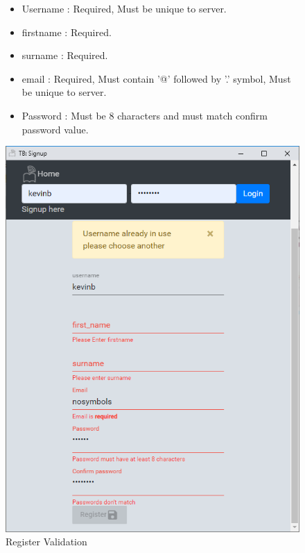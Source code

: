 \begin{figure}[H]
\begin{minipage}{.5\textwidth}  %
\lstset{0.6\textwidth, breaklines=true} %
\begin{itemize}
\item Username : Required, Must be unique to server.
\item firstname : Required.
\item surname : Required.
\item email : Required, Must contain '@' followed by '.' symbol, Must be unique to server.
\item Password : Must be 8 characters and must match confirm password value.
\end{itemize}

\end{minipage}
\qquad %
\begin{minipage}{0.4\textwidth} %
\includegraphics[width=.9\linewidth]{img/ui/signuperror.PNG} %
\caption{Register Validation}
\end{minipage}
\end{figure}

